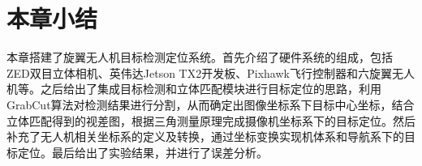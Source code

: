 \section{本章小结}
本章搭建了旋翼无人机目标检测定位系统。首先介绍了硬件系统的组成，包括ZED双目立体相机、英伟达Jetson TX2开发板、Pixhawk飞行控制器和六旋翼无人机等。之后给出了集成目标检测和立体匹配模块进行目标定位的思路，利用GrabCut算法对检测结果进行分割，从而确定出图像坐标系下目标中心坐标，结合立体匹配得到的视差图，根据三角测量原理完成摄像机坐标系下的目标定位。然后补充了无人机相关坐标系的定义及转换，通过坐标变换实现机体系和导航系下的目标定位。最后给出了实验结果，并进行了误差分析。






